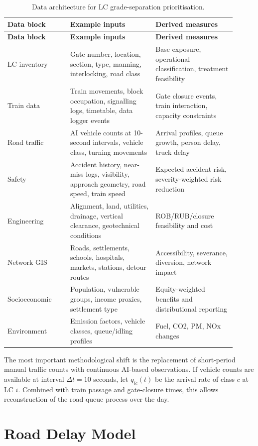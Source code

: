\documentclass[11pt,a4paper]{article}
\begin{document}
\begin{longtable}{p{0.25\linewidth}p{0.34\linewidth}p{0.32\linewidth}}
\caption{Data architecture for LC grade-separation prioritisation.}\label{tab:data}\\
\toprule
\textbf{Data block} & \textbf{Example inputs} & \textbf{Derived measures}\\
\midrule
\endfirsthead
\toprule
\textbf{Data block} & \textbf{Example inputs} & \textbf{Derived measures}\\
\midrule
\endhead
LC inventory & Gate number, location, section, type, manning, interlocking, road class & Base exposure, operational classification, treatment feasibility\\
Train data & Train movements, block occupation, signalling logs, timetable, data logger events & Gate closure events, train interaction, capacity constraints\\
Road traffic & AI vehicle counts at 10-second intervals, vehicle class, turning movements & Arrival profiles, queue growth, person delay, truck delay\\
Safety & Accident history, near-miss logs, visibility, approach geometry, road speed, train speed & Expected accident risk, severity-weighted risk reduction\\
Engineering & Alignment, land, utilities, drainage, vertical clearance, geotechnical conditions & ROB/RUB/closure feasibility and cost\\
Network GIS & Roads, settlements, schools, hospitals, markets, stations, detour routes & Accessibility, severance, diversion, network impact\\
Socioeconomic & Population, vulnerable groups, income proxies, settlement type & Equity-weighted benefits and distributional reporting\\
Environment & Emission factors, vehicle classes, queue/idling profiles & Fuel, CO2, PM, NOx changes\\
\bottomrule
\end{longtable}

The most important methodological shift is the replacement of short-period manual traffic counts with continuous AI-based observations. If vehicle counts are available at interval $\Delta t=10$ seconds, let $q_{ic}(t)$ be the arrival rate of class $c$ at LC $i$. Combined with train passage and gate-closure times, this allows reconstruction of the road queue process over the day.

\section{Road Delay Model}
\end{document}
